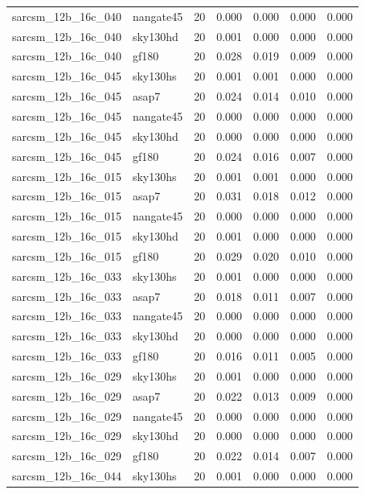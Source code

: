 \begin{tabular}{llrrrrr}
sarcsm\_12b\_16c\_040 & nangate45 & 20 & 0.000 & 0.000 & 0.000 & 0.000 \\
sarcsm\_12b\_16c\_040 & sky130hd & 20 & 0.001 & 0.000 & 0.000 & 0.000 \\
sarcsm\_12b\_16c\_040 & gf180 & 20 & 0.028 & 0.019 & 0.009 & 0.000 \\
sarcsm\_12b\_16c\_045 & sky130hs & 20 & 0.001 & 0.001 & 0.000 & 0.000 \\
sarcsm\_12b\_16c\_045 & asap7 & 20 & 0.024 & 0.014 & 0.010 & 0.000 \\
sarcsm\_12b\_16c\_045 & nangate45 & 20 & 0.000 & 0.000 & 0.000 & 0.000 \\
sarcsm\_12b\_16c\_045 & sky130hd & 20 & 0.000 & 0.000 & 0.000 & 0.000 \\
sarcsm\_12b\_16c\_045 & gf180 & 20 & 0.024 & 0.016 & 0.007 & 0.000 \\
sarcsm\_12b\_16c\_015 & sky130hs & 20 & 0.001 & 0.001 & 0.000 & 0.000 \\
sarcsm\_12b\_16c\_015 & asap7 & 20 & 0.031 & 0.018 & 0.012 & 0.000 \\
sarcsm\_12b\_16c\_015 & nangate45 & 20 & 0.000 & 0.000 & 0.000 & 0.000 \\
sarcsm\_12b\_16c\_015 & sky130hd & 20 & 0.001 & 0.000 & 0.000 & 0.000 \\
sarcsm\_12b\_16c\_015 & gf180 & 20 & 0.029 & 0.020 & 0.010 & 0.000 \\
sarcsm\_12b\_16c\_033 & sky130hs & 20 & 0.001 & 0.000 & 0.000 & 0.000 \\
sarcsm\_12b\_16c\_033 & asap7 & 20 & 0.018 & 0.011 & 0.007 & 0.000 \\
sarcsm\_12b\_16c\_033 & nangate45 & 20 & 0.000 & 0.000 & 0.000 & 0.000 \\
sarcsm\_12b\_16c\_033 & sky130hd & 20 & 0.000 & 0.000 & 0.000 & 0.000 \\
sarcsm\_12b\_16c\_033 & gf180 & 20 & 0.016 & 0.011 & 0.005 & 0.000 \\
sarcsm\_12b\_16c\_029 & sky130hs & 20 & 0.001 & 0.000 & 0.000 & 0.000 \\
sarcsm\_12b\_16c\_029 & asap7 & 20 & 0.022 & 0.013 & 0.009 & 0.000 \\
sarcsm\_12b\_16c\_029 & nangate45 & 20 & 0.000 & 0.000 & 0.000 & 0.000 \\
sarcsm\_12b\_16c\_029 & sky130hd & 20 & 0.000 & 0.000 & 0.000 & 0.000 \\
sarcsm\_12b\_16c\_029 & gf180 & 20 & 0.022 & 0.014 & 0.007 & 0.000 \\
sarcsm\_12b\_16c\_044 & sky130hs & 20 & 0.001 & 0.000 & 0.000 & 0.000 \\

\end{tabular}
